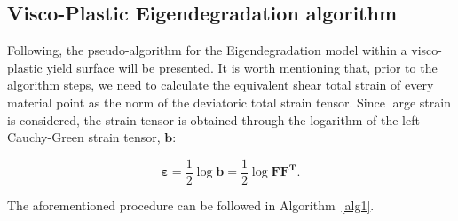 \documentclass[applsci,journal,article,submit,moreauthors,pdftex]{Definitions/mdpi}
\begin{document}
\subsection{Visco-Plastic Eigendegradation algorithm}
Following, the pseudo-algorithm for the Eigendegradation model within a visco-plastic yield surface will be presented. It is worth mentioning that, prior to the algorithm steps, we need to calculate the equivalent shear total strain of every material point as the norm of the deviatoric total strain tensor. Since large strain is considered, the strain tensor is obtained through the logarithm of the left Cauchy-Green strain tensor, $\mathbf{b}$:

\begin{equation}\label{eq21}
\boldsymbol{\varepsilon}=\frac{1}{2}\log\boldsymbol{b}=\frac{1}{2}\log\boldsymbol{F F^T}.
\end{equation}

The aforementioned procedure can be followed in Algorithm~\ref{alg1}.
\end{document}

